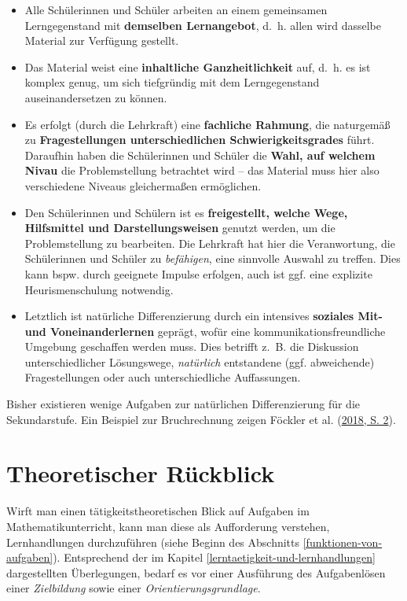 \documentclass[
]{scrbook}
\theoremstyle{definition}
\theoremstyle{definition}
\theoremstyle{definition}
\theoremstyle{definition}
\theoremstyle{remark}
\begin{document}
\begin{itemize}
\item
  Alle Schülerinnen und Schüler arbeiten an einem gemeinsamen Lerngegenstand mit \textbf{demselben Lernangebot}, d.~h. allen wird dasselbe Material zur Verfügung gestellt.
\item
  Das Material weist eine \textbf{inhaltliche Ganzheitlichkeit} auf, d.~h. es ist komplex genug, um sich tiefgründig mit dem Lerngegenstand auseinandersetzen zu können.
\item
  Es erfolgt (durch die Lehrkraft) eine \textbf{fachliche Rahmung}, die naturgemäß zu \textbf{Fragestellungen unterschiedlichen Schwierigkeitsgrades} führt. Daraufhin haben die Schülerinnen und Schüler die \textbf{Wahl, auf welchem Nivau} die Problemstellung betrachtet wird -- das Material muss hier also verschiedene Niveaus gleichermaßen ermöglichen.
\item
  Den Schülerinnen und Schülern ist es \textbf{freigestellt, welche Wege, Hilfsmittel und Darstellungsweisen} genutzt werden, um die Problemstellung zu bearbeiten. Die Lehrkraft hat hier die Veranwortung, die Schülerinnen und Schüler zu \emph{befähigen}, eine sinnvolle Auswahl zu treffen. Dies kann bspw. durch geeignete Impulse erfolgen, auch ist ggf. eine explizite Heurismenschulung notwendig.
\item
  Letztlich ist natürliche Differenzierung durch ein intensives \textbf{soziales Mit- und Voneinanderlernen} geprägt, wofür eine kommunikationsfreundliche Umgebung geschaffen werden muss. Dies betrifft z.~B. die Diskussion unterschiedlicher Lösungswege, \emph{natürlich} entstandene (ggf. abweichende) Fragestellungen oder auch unterschiedliche Auffassungen.
\end{itemize}

Bisher existieren wenige Aufgaben zur natürlichen Differenzierung für die Sekundarstufe. Ein Beispiel zur Bruchrechnung zeigen Föckler et al. (\protect\hyperlink{ref-Fockler2018}{2018, S. 2}).

\hypertarget{theoretischer-rueckblick}{%
\section{Theoretischer Rückblick}\label{theoretischer-rueckblick}}

Wirft man einen tätigkeitstheoretischen Blick auf Aufgaben im Mathematikunterricht, kann man diese als Aufforderung verstehen, Lernhandlungen durchzuführen (siehe Beginn des Abschnitts \ref{funktionen-von-aufgaben}). Entsprechend der im Kapitel \ref{lerntaetigkeit-und-lernhandlungen} dargestellten Überlegungen, bedarf es vor einer Ausführung des Aufgabenlösen einer \emph{Zielbildung} sowie einer \emph{Orientierungsgrundlage}.
\end{document}

